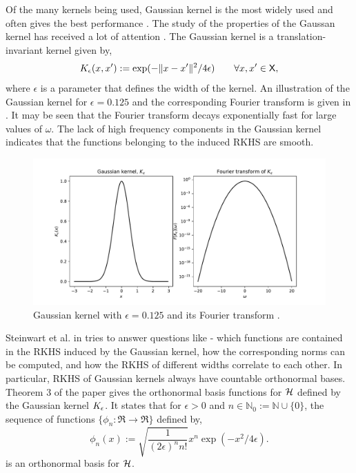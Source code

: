 Of the many kernels being used, Gaussian kernel is the most widely used and often gives the best performance \cite{min10}. The study of the properties of the Gaussan kernel has received a lot of attention \cite{stehussco06, min10,micchaxuzha06}. The Gaussian kernel is a translation-invariant kernel given by,
\begin{equation}
K_{\epsilon}(x,x') := \exp(-\|x - x'\|^2/ 4\epsilon) \qquad \forall x,x' \in {\sf X},
\end{equation}
where $\epsilon$ is a parameter that defines the width of the kernel. An illustration of the Gaussian kernel for $\epsilon = 0.125$ and the corresponding Fourier transform is given in . It may be seen that the Fourier transform decays exponentially fast for large values of $\omega$. The lack of high frequency components in the Gaussian kernel indicates that the functions belonging to the induced RKHS are smooth.  
\begin{figure}[htbp]
	\centering
	\includegraphics[width=6in]{images/Chap3_Gaussian_kernel}
	\caption{Gaussian kernel with $\epsilon = 0.125$ and its Fourier transform \cite{schsmo01}.}
	\label{fig:gaussian_kernel}
\end{figure}

Steinwart et al. in \cite{stehussco06} tries to answer questions like - which functions are contained in the RKHS induced by the Gaussian kernel, how the corresponding norms can be computed, and how the RKHS of different widths correlate to each other. 
In particular, RKHS of Gaussian kernels always have countable orthonormal bases. Theorem 3 of the paper gives the orthonormal basis functions for ${\cal H}$ defined by the Gaussian kernel $K_\epsilon$. It states that for $\epsilon >0$ and $n \in \mathbb{N}_0 := \mathbb{N} \cup \{0\}$, the sequence of functions $\{\phi_n : \Re \to \Re\}$ defined by,
\begin{equation}
\phi_n(x) := \sqrt{\frac{1}{(2\epsilon)^n n!}}x^n \exp(-x^2/4\epsilon).
\end{equation}
is an orthonormal basis for ${\cal H}$.

